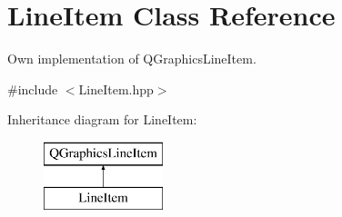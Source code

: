 \hypertarget{classLineItem}{}\section{Line\+Item Class Reference}
\label{classLineItem}


Own implementation of Q\+Graphics\+Line\+Item.  




{\ttfamily \#include $<$Line\+Item.\+hpp$>$}

Inheritance diagram for Line\+Item\+:\begin{figure}[H]
\begin{center}
\leavevmode
\includegraphics[height=2.000000cm]{classLineItem}
\end{center}
\end{figure}
